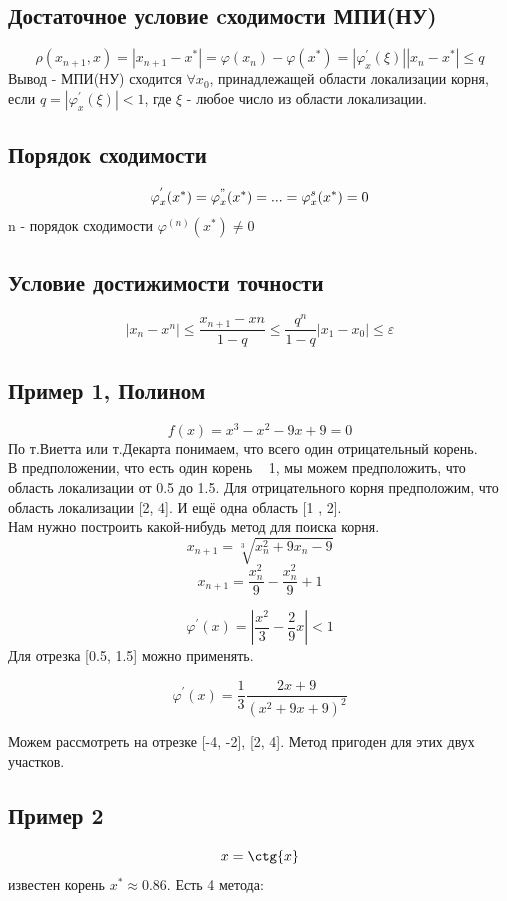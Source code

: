 \documentclass[a4paper,12pt]{article}
\newcommand\attention[1]{\colorbox{cyan!30}{#1}}
\begin{document}
\subsection*{Достаточное условие cходимости МПИ(НУ)}
\[\rho(x_{n+1}, x) = |x_{n+1} - x^*| = \varphi(x_n) - \varphi(x^*) = |\varphi_x^{'} (\xi)||x_n-x^*| \leq q\]
Вывод - МПИ(НУ) сходится $\forall x_0$, принадлежащей области локализации корня, если $q = |\varphi_x^{'}(\xi)| < 1$, где $\xi$ - любое число из области локализации.\\

\subsection*{Порядок сходимости}
    \[\varphi_x^{'} (x^*) = \varphi_x^{"}(x^*) = ... = \varphi_x^{s} (x^*) = 0\]
    n - порядок сходимости $\varphi^{(n)} (x^*) \neq 0$
    
\subsection*{Условие достижимости точности }
\[|x_n - x^n| \leq \frac{x_{n+1} - x{n}}{1 - q} \leq \frac{q^n}{1 - q} |x_1 - x_0| \leq \varepsilon\]

\subsection*{Пример 1, Полином}
\[f(x) = x ^ 3 - x ^ 2 - 9x + 9 = 0\]
По т.Виетта или \attention{т.Декарта} понимаем, что всего один отрицательный корень.\\
В предположении, что есть один корень ~ 1, мы можем предположить, что область локализации от 0.5 до 1.5. Для отрицательного корня предположим, что область локализации [2, 4]. И ещё одна область [1 , 2].\\
Нам нужно построить какой-нибудь метод для поиска корня.
\[x_{n+1} = \sqrt[3]{x_n^2 + 9x_n - 9}\]
\[x_{n+1} = \frac{x_n^2}{9} - \frac{x_n^2}{9} + 1\]

\[\varphi^{'}(x) = |\frac{x^2}{3} - \frac{2}{9}x| < 1\]
Для отрезка [0.5, 1.5] можно применять.

\[\varphi ^{'}(x) = \frac{1}{3}\frac{2x + 9}{(x^2 + 9x + 9)^2}\]

Можем рассмотреть на отрезке [-4, -2], [2, 4]. Метод пригоден для этих двух участков.\\

\subsection*{Пример 2}
\[x = \ctg{x}\]
известен корень $x^* \approx 0.86$. Есть 4 метода:
\end{document}
